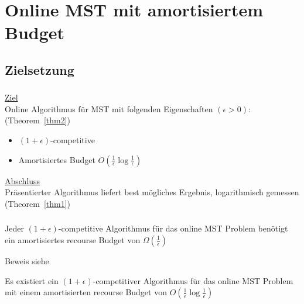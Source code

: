 \section{Online MST mit amortisiertem Budget}

\subsection{Zielsetzung}
\begin{frame}
    \frametitle{\insertsubsection}
    \underline{Ziel}\\
    \vspace{1em}
    Online Algorithmus für MST mit folgenden Eigenschaften $(\epsilon > 0)$: (Theorem~\ref{thm2})\\
    \vspace{1em}
    \begin{itemize}
        \itemsep\setlength{.8em}
        \item $(1+\epsilon)$-competitive
        \item Amortisiertes Budget $O(\frac{1}{\epsilon}\log\frac{1}{\epsilon})$
    \end{itemize}
    \vspace{1em}

    \underline{Abschluss}\\
    \vspace{1em}
    Präsentierter Algorithmus liefert best mögliches Ergebnis, logarithmisch gemessen (Theorem~\ref{thm1})
\end{frame}

\begin{frame}
    \frametitle{\insertsection}
    \begin{theorem}
        \label{thm1}
        \vspace{.5em}
        Jeder $(1+\epsilon)$-competitive Algorithmus für das online MST Problem benötigt ein amortisiertes recourse Budget von $\Omega(\frac{1}{\epsilon})$
        \vspace{1em}
    \end{theorem}
    Beweis siehe \cite{recourse2016}
    \vspace{1em}

    \begin{theorem}
        \label{thm2}
        \vspace{.5em}
        Es existiert ein $(1+\epsilon)$-competitiver Algorithmus für das online MST Problem mit einem amortisierten recourse Budget von $O(\frac{1}{\epsilon}\log\frac{1}{\epsilon})$
        \vspace{1em}
    \end{theorem}
\end{frame}

